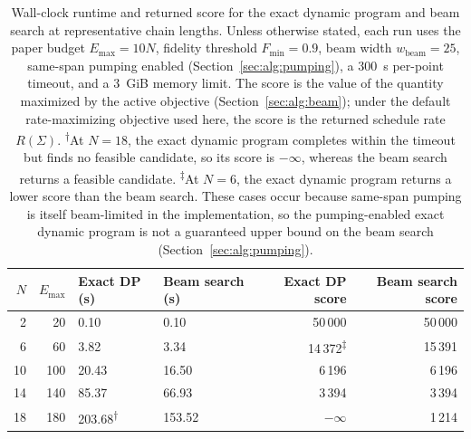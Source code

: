 \begin{table}[ht]
\centering
\caption{Wall-clock runtime and returned score for the exact dynamic program and beam search at representative chain lengths. Unless otherwise stated, each run uses the paper budget $E_{\max}=10N$, fidelity threshold $F_{\min}=0.9$, beam width $w_{\text{beam}}=25$, same-span pumping enabled (Section~\ref{sec:alg:pumping}), a 300~s per-point timeout, and a 3~GiB memory limit. The score is the value of the quantity maximized by the active objective (Section~\ref{sec:alg:beam}); under the default rate-maximizing objective used here, the score is the returned schedule rate $R(\Sigma)$. \textsuperscript{$\dagger$}At $N=18$, the exact dynamic program completes within the timeout but finds no feasible candidate, so its score is $-\infty$, whereas the beam search returns a feasible candidate. \textsuperscript{$\ddagger$}At $N=6$, the exact dynamic program returns a lower score than the beam search. These cases occur because same-span pumping is itself beam-limited in the implementation, so the pumping-enabled exact dynamic program is not a guaranteed upper bound on the beam search (Section~\ref{sec:alg:pumping}).}
\label{tab:runtimes}
\small
\begin{tabular}{rrllrr}
\toprule
$N$ & $E_{\max}$ & Exact DP (s) & Beam search (s) & Exact DP score & Beam search score \\
\midrule
2  & 20  & 0.10 & 0.10 & 50\,000 & 50\,000 \\
6  & 60  & 3.82 & 3.34 & 14\,372\textsuperscript{$\ddagger$} & 15\,391 \\
10 & 100 & 20.43 & 16.50 & 6\,196 & 6\,196 \\
14 & 140 & 85.37 & 66.93 & 3\,394 & 3\,394 \\
18 & 180 & 203.68\textsuperscript{$\dagger$} & 153.52 & $-\infty$ & 1\,214 \\
\bottomrule
\end{tabular}
\end{table}